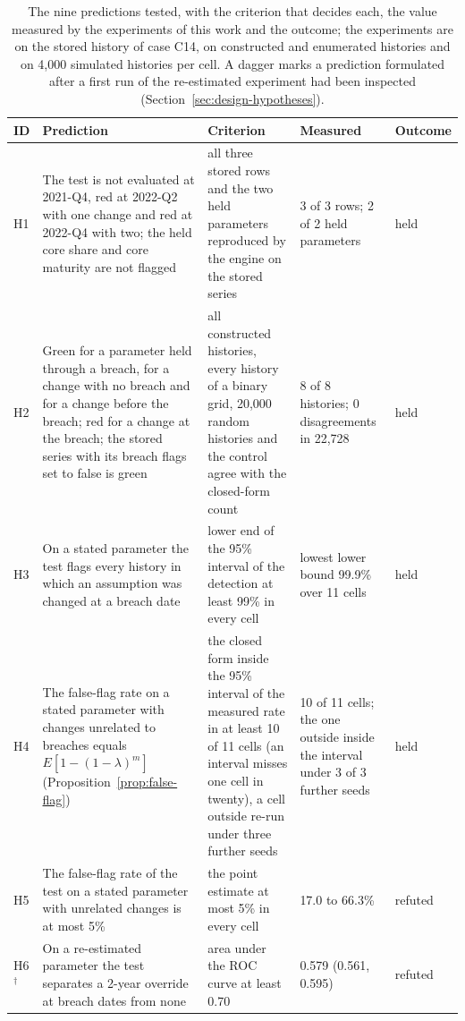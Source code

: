 \begin{table}[htbp]
\centering
\footnotesize
\caption{The nine predictions tested, with the criterion that decides each, the value measured by the experiments of this work and the outcome; the experiments are on the stored history of case C14, on constructed and enumerated histories and on 4,000 simulated histories per cell. A dagger marks a prediction formulated after a first run of the re-estimated experiment had been inspected (Section~\ref{sec:design-hypotheses}).}
\label{tab:hypotheses}
\begin{tabular}{@{}l p{4.6cm} p{3.2cm} p{3.1cm} l@{}}
\toprule
ID & Prediction & Criterion & Measured & Outcome \\
\midrule
H1 & The test is not evaluated at 2021-Q4, red at 2022-Q2 with one change and red at 2022-Q4 with two; the held core share and core maturity are not flagged & all three stored rows and the two held parameters reproduced by the engine on the stored series & 3 of 3 rows; 2 of 2 held parameters & held \\
H2 & Green for a parameter held through a breach, for a change with no breach and for a change before the breach; red for a change at the breach; the stored series with its breach flags set to false is green & all constructed histories, every history of a binary grid, 20,000 random histories and the control agree with the closed-form count & 8 of 8 histories; 0 disagreements in 22,728 & held \\
H3 & On a stated parameter the test flags every history in which an assumption was changed at a breach date & lower end of the 95\% interval of the detection at least 99\% in every cell & lowest lower bound 99.9\% over 11 cells & held \\
H4 & The false-flag rate on a stated parameter with changes unrelated to breaches equals $E[1-(1-\lambda)^m]$ (Proposition~\ref{prop:false-flag}) & the closed form inside the 95\% interval of the measured rate in at least 10 of 11 cells (an interval misses one cell in twenty), a cell outside re-run under three further seeds & 10 of 11 cells; the one outside inside the interval under 3 of 3 further seeds & held \\
H5 & The false-flag rate of the test on a stated parameter with unrelated changes is at most 5\% & the point estimate at most 5\% in every cell & 17.0 to 66.3\% & refuted \\
H6$^\dagger$ & On a re-estimated parameter the test separates a 2-year override at breach dates from none & area under the ROC curve at least 0.70 & 0.579 (0.561, 0.595) & refuted \\

\end{tabular}
\end{table}
